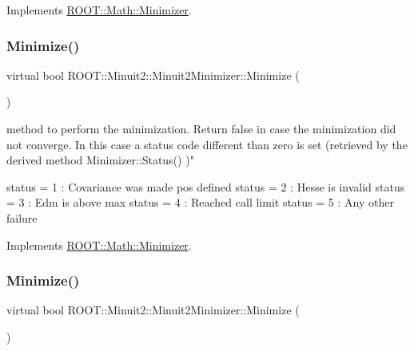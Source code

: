 Implements \mbox{\hyperlink{classROOT_1_1Math_1_1Minimizer_a861036d38a21d9a60d44e068397307af}{R\+O\+O\+T\+::\+Math\+::\+Minimizer}}.

\mbox{\label{classROOT_1_1Minuit2_1_1Minuit2Minimizer_af5d2da195d2b1a7eac6d9b8859eec2b9}} 
\subsubsection{\texorpdfstring{Minimize()}{Minimize()}\hspace{0.1cm}{\footnotesize\ttfamily [1/3]}}
{\footnotesize\ttfamily virtual bool R\+O\+O\+T\+::\+Minuit2\+::\+Minuit2\+Minimizer\+::\+Minimize (\begin{DoxyParamCaption}{ }\end{DoxyParamCaption})\hspace{0.3cm}{\ttfamily [virtual]}}

method to perform the minimization. Return false in case the minimization did not converge. In this case a status code different than zero is set (retrieved by the derived method Minimizer\+::\+Status() )"

status = 1 \+: Covariance was made pos defined status = 2 \+: Hesse is invalid status = 3 \+: Edm is above max status = 4 \+: Reached call limit status = 5 \+: Any other failure 

Implements \mbox{\hyperlink{classROOT_1_1Math_1_1Minimizer_a5f6a6307935a17fb13dac1ee7f1c41fd}{R\+O\+O\+T\+::\+Math\+::\+Minimizer}}.

\mbox{\label{classROOT_1_1Minuit2_1_1Minuit2Minimizer_af5d2da195d2b1a7eac6d9b8859eec2b9}} 
\subsubsection{\texorpdfstring{Minimize()}{Minimize()}\hspace{0.1cm}{\footnotesize\ttfamily [2/3]}}
{\footnotesize\ttfamily virtual bool R\+O\+O\+T\+::\+Minuit2\+::\+Minuit2\+Minimizer\+::\+Minimize (\begin{DoxyParamCaption}{ }\end{DoxyParamCaption})\hspace{0.3cm}{\ttfamily [virtual]}}

